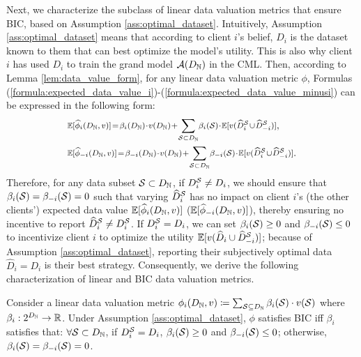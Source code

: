 Next, we characterize the subclass of linear data valuation metrics that ensure BIC, based on Assumption \ref{ass:optimal_dataset}.
Intuitively, Assumption \ref{ass:optimal_dataset} means that according to client $i$’s belief, $D_i$ is the dataset known to them that can best optimize the model’s utility.
This is also why client $i$ has used $D_i$ to train the grand model $\mathcal{A}(D_{\mathbb{N}})$ in the CML.
Then, according to Lemma \ref{lem:data_value_form}, for any linear data valuation metric $\phi$, Formulas (\ref{formula:expected_data_value_i})-(\ref{formula:expected_data_value_minusi}) can be expressed in the following form:
\begin{align*}
    & \medmath{\mathbb{E}[\empiricaldatavalue_{i}(\granddataset, v)] \!=\!  \beta_i(\granddataset) \!\cdot\! v(\granddataset) \!+\! \sum_{\datasubset\subset \granddataset} \!\beta_i(\datasubset) \!\cdot\! \mathbb{E}[v(\reportedstoi \!\cup\! \reportedstominusi)]},\\
    & \medmath{\mathbb{E}[\empiricaldatavalue_{-i}(\granddataset, v)] \!=\!  \beta_{-i}(\granddataset) \!\cdot\! v(\granddataset) \!+\! \sum_{\datasubset\subset \granddataset} \!\beta_{-i}(\datasubset) \!\cdot\! \mathbb{E}[v(\reportedstoi \!\cup\! \reportedstominusi)]}.
\end{align*}
Therefore, for any data subset $\mathcal{S} \subset D_{\mathbb{N}}$, if $D^{\mathcal{S}}_{i} \neq D_i$, we should ensure that $\beta_i(\mathcal{S}) = \beta_{-i}(\mathcal{S})= 0$ such that varying $\widehat{D}^{\mathcal{S}}_{i}$ has no impact on client $i$'s (the other clients') expected data value $\mathbb{E}[\widehat{\phi}_{i}(D_{\mathbb{N}}, v)]$ ($\mathbb{E}[\widehat{\phi}_{-i}(D_{\mathbb{N}}, v)]$), thereby ensuring no incentive to report $\widehat{D}^{\mathcal{S}}_{i} \neq D^{\mathcal{S}}_{i}$.
If $D^{\mathcal{S}}_{i} = D_i$, we can set $\beta_i(\mathcal{S}) \geq 0$ and $\beta_{-i}(\mathcal{S}) \leq 0$ to incentivize client $i$ to optimize the utility $\mathbb{E}[v(\widehat{D}_i \cup \widehat{D}^{\mathcal{S}}_{-i})]$;
because of Assumption \ref{ass:optimal_dataset}, reporting their subjectively optimal data $\widehat{D}_i = D_i$ is their best strategy.
Consequently, we derive the following characterization of linear and BIC data valuation metrics.
\begin{theorem}[Characterization 1]
\label{thm:characterization1}
    Consider a linear data valuation metric $\phi_i(D_{\mathbb{N}}, v) \coloneqq \sum_{\mathcal{S} \subseteq D_{\mathbb{N}}} \beta_i(\mathcal{S}) \cdot v(\mathcal{S})$ where $\beta_i: 2^{D_{\mathbb{N}}} \rightarrow \mathbb{R}$.
    Under Assumption \ref{ass:optimal_dataset}, $\phi$ satisfies BIC iff $\beta_i$ satisfies that: $\forall \mathcal{S} \subset D_{\mathbb{N}}$, if $D^{\mathcal{S}}_{i} = D_i$, $\beta_i(\mathcal{S}) \geq 0$ and $\beta_{-i}(\mathcal{S}) \leq 0$;
    otherwise, $\beta_i(\mathcal{S}) = \beta_{-i}(\mathcal{S}) = 0$.
\end{theorem}

